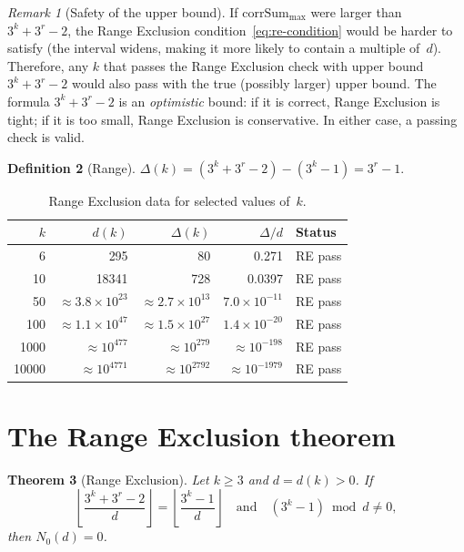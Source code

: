 \documentclass[11pt, a4paper]{amsart}
\theoremstyle{plain}
\newtheorem{theorem}{Theorem}[section]
\theoremstyle{definition}
\newtheorem{definition}[theorem]{Definition}
\theoremstyle{remark}
\newtheorem{remark}[theorem]{Remark}
\newcommand{\corrSum}{\mathrm{corrSum}}
\begin{document}
\begin{remark}[Safety of the upper bound]\label{rem:upper-safe}
  If $\corrSum_{\max}$ were larger than $3^k + 3^r - 2$,
  the Range Exclusion condition~\eqref{eq:re-condition}
  would be harder to satisfy (the interval widens, making
  it more likely to contain a multiple of~$d$).
  Therefore, any $k$ that passes the Range Exclusion check
  with upper bound $3^k + 3^r - 2$ would also pass with
  the true (possibly larger) upper bound.
  The formula $3^k + 3^r - 2$ is an \emph{optimistic}
  bound: if it is correct, Range Exclusion is tight;
  if it is too small, Range Exclusion is conservative.
  In either case, a passing check is valid.
\end{remark}

\begin{definition}[Range]\label{def:range}
  $\Delta(k) = (3^k + 3^r - 2) - (3^k - 1) = 3^r - 1$.
\end{definition}

\begin{table}[ht]
\centering
\caption{Range Exclusion data for selected values of~$k$.}
\label{tab:ratio}
\begin{tabular}{rrrrl}
\toprule
$k$ & $d(k)$ & $\Delta(k)$ & $\Delta/d$ & Status \\
\midrule
6 & 295 & 80 & 0.271 & RE pass \\
10 & 18341 & 728 & 0.0397 & RE pass \\
50 & $\approx 3.8 \times 10^{23}$ & $\approx 2.7 \times 10^{13}$ & $7.0 \times 10^{-11}$ & RE pass \\
100 & $\approx 1.1 \times 10^{47}$ & $\approx 1.5 \times 10^{27}$ & $1.4 \times 10^{-20}$ & RE pass \\
1000 & $\approx 10^{477}$ & $\approx 10^{279}$ & $\approx 10^{-198}$ & RE pass \\
10000 & $\approx 10^{4771}$ & $\approx 10^{2792}$ & $\approx 10^{-1979}$ & RE pass \\
\bottomrule
\end{tabular}
\end{table}

\section{The Range Exclusion theorem}\label{sec:range-exclusion}

\begin{theorem}[Range Exclusion]\label{thm:re}
  Let $k \geq 3$ and $d = d(k) > 0$.  If
  \begin{equation}\label{eq:re-condition}
    \left\lfloor \frac{3^k + 3^r - 2}{d} \right\rfloor
    = \left\lfloor \frac{3^k - 1}{d} \right\rfloor
    \quad\text{and}\quad
    (3^k - 1) \bmod d \neq 0,
  \end{equation}
  then $N_0(d) = 0$.
\end{theorem}
\end{document}
